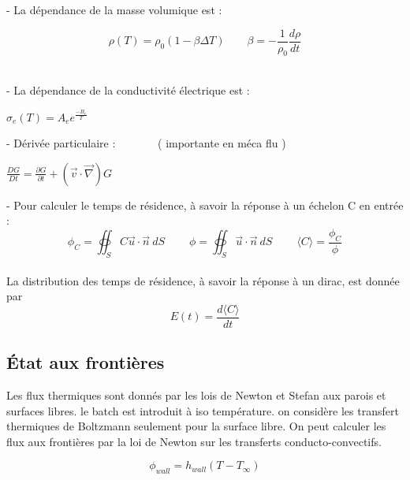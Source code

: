 \documentclass[12pt, a4paper, french, BCOR = 0pt, DIV = 10]{scrartcl}
\begin{document}
    - La dépendance de la masse volumique est : \\ [0.5 cm]
    \begin{center}
        
        
        $$
        \rho(T) = \rho_{0}  (1 - \beta \Delta T) ~~~~~~~~~ 
        \beta = -\frac{1}{\rho_{0}} \frac{d\rho}{dt}
        $$
        \\
    \end{center}
    
    
    
    - La dépendance de la conductivité électrique est : \\ [0.5 cm]
    \begin{center}
        $ 
        \sigma_{e} (T) =  A_{e} e^{\frac{-B_{e}}{T}}
        $
    \end{center}
    
    - Dérivée particulaire : ~~~~~~~( importante en méca flu )\\
    
    \begin{center}
        $ \frac{DG}{Dt}=\frac{\partial G}{\partial t} + (\vec {v} \cdot \vec {\nabla } ) G
        $ \\    
    \end{center}
    
    
    
    - Pour calculer le temps  de résidence, à savoir la réponse à un échelon C en entrée :\\ [0.5cm]
    $$
    \phi_{C} =  \oiint_S C\vec{u} \cdot \vec{n}~dS  ~~~~~~~~~~ \phi = \oiint_S \vec{u} \cdot \vec{n}~dS  ~~~~~~~~~~
    \langle C \rangle = \frac{\phi_{C}}{\phi}
    $$ 
    \\ [0.5 cm]
    La distribution des temps de résidence, à savoir la réponse à un dirac, est donnée par \[E(t)=\frac{d\langle C \rangle}{dt}\]
    
    \subsection{État aux frontières}
    
    Les flux thermiques sont donnés par les lois de Newton et Stefan aux parois et surfaces libres. le batch est introduit à iso température. on considère les transfert thermiques de Boltzmann seulement pour la surface libre.
    On peut calculer les flux aux frontières par la loi de Newton sur les transferts conducto-convectifs.\\ 
    \begin{center}
        $$
        \phi_{wall} = h_{wall} (T - T_{\infty})
        $$
    \end{center}
    
\end{document}

